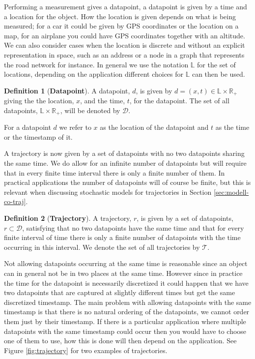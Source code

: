 \documentclass[12pt]{article}
\newcommand{\loc}{x}
\newcommand{\tim}{t}
\newcommand{\data}{d}
\newcommand{\traj}{r}
\newcommand{\locset}{\mathbb{L}}
\newcommand{\timeset}{\mathbb{R}_+}
\newcommand{\dataset}{\mathcal{D}}
\newcommand{\trajset}{\mathcal{T}}
\theoremstyle{definition}
\newtheorem{definition}{Definition}[section]
\begin{document}
Performing a measurement gives a datapoint, a datapoint is given by a
time and a location for the object. How the location is given depends
on what is being measured; for a car it could be given by GPS
coordinates or the location on a map, for an airplane you could have
GPS coordinates together with an altitude. We can also consider cases
when the location is discrete and without an explicit representation
in space, such as an address or a node in a graph that represents the
road network for instance. In general we use the notation \(\locset\)
for the set of locations, depending on the application different
choices for \(\locset\) can then be used.
\begin{definition}[\textbf{Datapoint}]
  \label{def:datapoint}
  A datapoint, \(\data\), is given by
  \(\data = (\loc, \tim) \in \locset \times \timeset\) giving the the
  location, \(\loc\), and the time, \(\tim\), for the datapoint. The
  set of all datapoints, \(\locset \times \timeset\), will be denoted
  by \(\dataset\).
\end{definition}
For a datapoint \(\data\) we refer to \(\loc\) as the location of the
datapoint and \(\tim\) as the time or the timestamp of it.

A trajectory is now given by a set of datapoints with no two
datapoints sharing the same time. We do allow for an infinite number
of datapoints but will require that in every finite time interval
there is only a finite number of them. In practical applications the
number of datapoints will of course be finite, but this is relevant
when discussing stochastic models for trajectories in Section
\ref{sec:modell-co-traj}.
\begin{definition}[\textbf{Trajectory}]
  \label{def:trajectory}
  A trajectory, \(\traj\), is given by a set of datapoints,
  \(\traj \subset \dataset\), satisfying that no two datapoints have
  the same time and that for every finite interval of time there is
  only a finite number of datapoints with the time occurring in this
  interval. We denote the set of all trajectories by \(\trajset\).
\end{definition}
Not allowing datapoints occurring at the same time is reasonable since
an object can in general not be in two places at the same time.
However since in practice the time for the datapoint is necessarily
discretized it could happen that we have two datapoints that are
captured at slightly different times but get the same discretized
timestamp. The main problem with allowing datapoints with the same
timestamp is that there is no natural ordering of the datapoints, we
cannot order them just by their timestamp. If there is a particular
application where multiple datapoints with the same timestamp could
occur then you would have to choose one of them to use, how this is
done will then depend on the application. See Figure
\ref{fig:trajectory} for two examples of trajectories.
\end{document}
